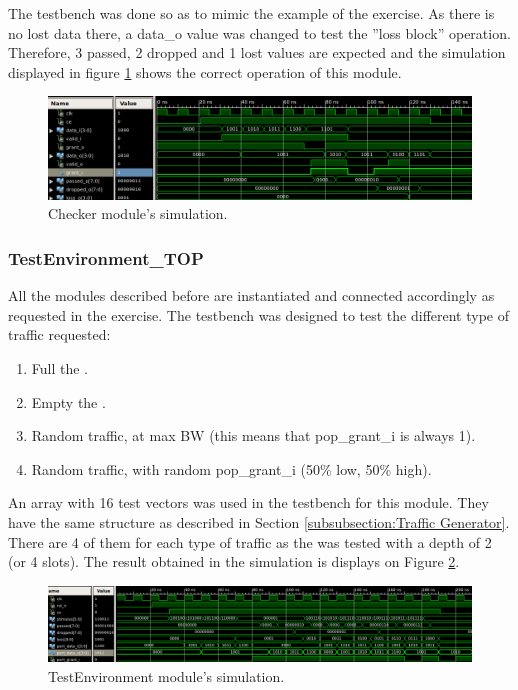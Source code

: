 \documentclass[12pt]{article}
\begin{document}
The testbench was done so as to mimic the example of the exercise.  As there is no lost data there, a data\_o value was changed to test the ''loss block'' operation.  Therefore, 3 passed, 2 dropped and 1 lost values are expected and the simulation displayed in figure \ref{fig:Checker simulation} shows the correct operation of this module.

\begin{figure}[ht]
\centering
\includegraphics[width=15cm]{images/checker-simulation}
\caption{\label{fig:Checker simulation}Checker module's simulation.}
\end{figure}

\subsubsection{TestEnvironment\_TOP}
All the modules described before are instantiated and connected accordingly as requested in the exercise.  The testbench was designed to test the different type of traffic requested:

\begin{enumerate}
	\item Full the \fifo.
	\item Empty the \fifo.
	\item Random traffic, at max BW (this means that pop\_grant\_i is always 1).
	\item Random traffic, with random pop\_grant\_i (50\% low, 50\% high).
\end{enumerate}

An array with 16 test vectors was used in the testbench for this module.  They have the same structure as described in Section \ref{subsubsection:Traffic Generator}.  There are 4 of them for each type of traffic as the \fifo was tested with a depth of 2 (or 4 slots).  The result obtained in the simulation is displays on Figure \ref{fig: TestEnvironment simulation}.

\begin{figure}[ht]
\centering
\includegraphics[width=15cm]{images/testenvironment-simulation}
\caption{\label{fig: TestEnvironment simulation}TestEnvironment module's simulation.}
\end{figure}
\end{document}
